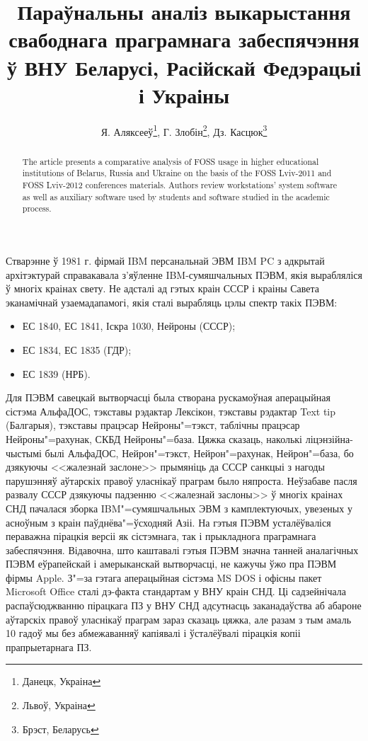 \documentclass[10pt, a5paper]{article}
\begin{document}
\title{Параўнальны аналіз выкарыстання свабоднага праграмнага забеспячэння ў ВНУ Беларусі, Расійскай Федэрацыі і Украіны}%

\author{Я. Аляксееў\footnote{Данецк, Украіна}, Г. Злобін\footnote{Львоў, Украіна}, Дз. Касцюк\footnote{Брэст, Беларусь}}
\maketitle

\begin{abstract}
The article presents a comparative analysis of FOSS usage in higher educational institutions of Belarus, Russia and Ukraine on the basis of the FOSS Lviv-2011 and FOSS Lviv-2012 conferences materials. Authors review workstations' system software as well as auxiliary software used by students and software studied in the academic process.
\end{abstract}

Стварэнне ў 1981 г. фірмай IBM персанальнай ЭВМ IBM PC з адкрытай архітэктурай справакавала з'яўленне IBM-сумяшчальных ПЭВМ, якія вырабляліся ў многіх краінах свету. Не адсталі ад гэтых краін СССР і краіны Савета эканамічнай узаемадапамогі, якія сталі вырабляць цэлы спектр такіх ПЭВМ:

\begin{itemize}
  \item ЕС 1840, ЕС 1841, Іскра 1030, Нейроны (СССР);
  \item ЕС 1834, ЕС 1835 (ГДР);
  \item ЕС 1839 (НРБ).
\end{itemize}

Для ПЭВМ савецкай вытворчасці была створана рускамоўная аперацыйная сістэма
АльфаДОС, тэкставы рэдактар Лексікон, тэкставы рэдактар Text tip (Балгарыя),
тэкставы працэсар Нейроны"=тэкст, таблічны працэсар Нейроны"=рахунак, СКБД
Нейроны"=база. Цяжка сказаць, наколькі ліцэнзійна-чыстымі былі АльфаДОС,
Нейрон"=тэкст, Нейрон"=рахунак, Нейрон"=база, бо дзякуючы <<жа\-лез\-най заслоне>>
прымяніць да СССР санкцыі з нагоды парушэнняў аўтарскіх правоў уласнікаў
праграм было няпроста. Неўзабаве пасля развалу СССР дзякуючы падзенню
<<жалезнай заслоны>> ў многіх краінах СНД пачалася зборка IBM"=сумяшчальных ЭВМ
з камплектуючых, увезеных у асноўным з краін паўднёва"=ўсходняй Азіі. На гэтыя
ПЭВМ усталёўваліся пераважна пірацкія версіі як сістэмнага, так і прыкладнога
праграмнага забеспячэння. Відавочна, што каштавалі гэтыя ПЭВМ значна танней
аналагічных ПЭВМ еўрапейскай і амерыканскай вытворчасці, не кажучы ўжо пра
ПЭВМ фірмы Apple. З"=за гэтага аперацыйная сістэма MS DOS і офісны пакет Microsoft Office
сталі дэ-факта стандартам у ВНУ краін СНД. Ці садзейнічала распаўсюджванню
пірацкага ПЗ у ВНУ СНД адсутнасць заканадаўства аб абароне аўтарскіх правоў
уласнікаў праграм зараз сказаць цяжка, але разам з тым амаль 10 гадоў мы без
абмежаванняў капіявалі і ўсталёўвалі пірацкія копіі прапрыетарнага ПЗ.
\end{document}
